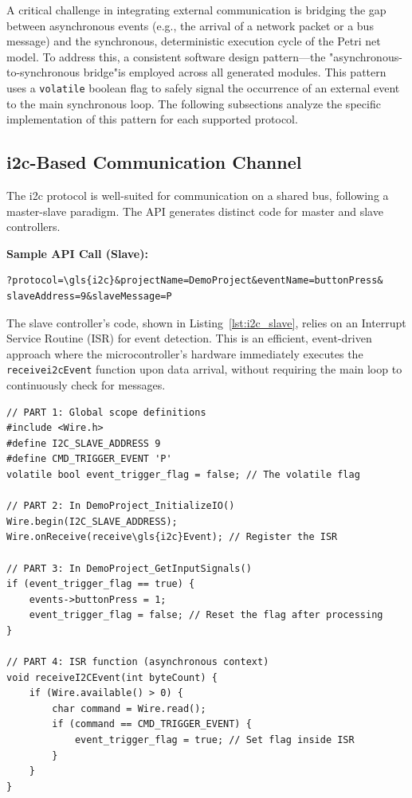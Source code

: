 A critical challenge in integrating external communication is bridging the gap between asynchronous events (e.g., the arrival of a network packet or a bus message) and the synchronous, deterministic execution cycle of the Petri net model. To address this, a consistent software design pattern—the "asynchronous-to-synchronous bridge"is employed across all generated modules. This pattern uses a \texttt{volatile} boolean flag to safely signal the occurrence of an external event to the main synchronous loop. The following subsections analyze the specific implementation of this pattern for each supported protocol.

\subsection{\gls{i2c}-Based Communication Channel}
The \gls{i2c} protocol is well-suited for communication on a shared bus, following a master-slave paradigm. The API generates distinct code for master and slave controllers.

\noindent\textbf{Sample API Call (Slave):}
\begin{verbatim}
?protocol=\gls{i2c}&projectName=DemoProject&eventName=buttonPress&
slaveAddress=9&slaveMessage=P
\end{verbatim}

The slave controller's code, shown in Listing~\ref{lst:i2c_slave}, relies on an Interrupt Service Routine (ISR) for event detection. This is an efficient, event-driven approach where the microcontroller's hardware immediately executes the \texttt{receive\gls{i2c}Event} function upon data arrival, without requiring the main loop to continuously check for messages.

\begin{verbatim}
// PART 1: Global scope definitions
#include <Wire.h>
#define I2C_SLAVE_ADDRESS 9
#define CMD_TRIGGER_EVENT 'P'
volatile bool event_trigger_flag = false; // The volatile flag

// PART 2: In DemoProject_InitializeIO()
Wire.begin(I2C_SLAVE_ADDRESS);
Wire.onReceive(receive\gls{i2c}Event); // Register the ISR

// PART 3: In DemoProject_GetInputSignals()
if (event_trigger_flag == true) {
    events->buttonPress = 1;
    event_trigger_flag = false; // Reset the flag after processing
}

// PART 4: ISR function (asynchronous context)
void receiveI2CEvent(int byteCount) {
    if (Wire.available() > 0) {
        char command = Wire.read();
        if (command == CMD_TRIGGER_EVENT) {
            event_trigger_flag = true; // Set flag inside ISR
        }
    }
}
\end{verbatim}

